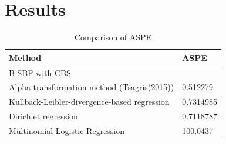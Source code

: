 \section{Results}\label{sec:results}




\begin{table}
\begin{tabular}{ | p{9cm} | m{1.5cm} | } 
\hline
Method & ASPE \\
\hline
B-SBF with CBS &  \\ 
\hline
Alpha transformation method (Tsagris(2015)) & 0.512279 \\ 
\hline
Kullback-Leibler-divergence-based regression & 0.7314985 \\
\hline
Dirichlet regression & 0.7118787 \\
\hline
Multinomial Logistic Regression & 100.0437 \\
\hline
\end{tabular}
 \caption{Comparison of ASPE}
 \label{table:1}
\end{table}

